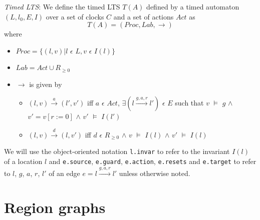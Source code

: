 \begin{definition}
  \emph{Timed LTS}: We define the timed LTS $T(A)$ defined by a timed
  automaton $(L, l_{0}, E, I)$ over a set of clocks $C$ and a set of
  actions $Act$ as 
  \begin{displaymath}
    T(A) = (Proc, Lab, \rightarrow)
  \end{displaymath}
  where
  \begin{itemize}
  \item $Proc = \{(l, v) | l$ $\epsilon$ $L, v$ $\epsilon$ $I(l)\}$
  \item $Lab = Act \cup R_{\ge 0}$
  \item $\rightarrow$ is given by
    \begin{itemize}
    \item $(l, v) \xrightarrow{a} (l', v')$ iff $a$ $\epsilon$ $Act$, $\exists (l
      \xrightarrow{g, a, r} l')$ $\epsilon$ $E$ such that $v$ $\models$
      $g$ $\wedge$ $v'=v[r:=0]$ $\wedge$ $v'$ $\models$ $I(l')$
    \item $(l, v) \xrightarrow{d} (l, v')$ iff $d$ $\epsilon$ $R_{\ge
      0}$ $\wedge$ $v$ $\models$ $I(l)$ $\wedge$ $v'$ $\models$ $I(l)$
    \end{itemize}
  \end{itemize}

\end{definition}

We will use the object-oriented notation \texttt{l.invar} to refer to
the invariant $I(l)$ of a location $l$ and \texttt{e.source}, \texttt{e.guard},
\texttt{e.action}, \texttt{e.resets} and \texttt{e.target} to refer to
$l$, $g$, $a$, $r$, $l'$ of
an edge $e = l \xrightarrow{g, a, r} l'$ unless otherwise noted.

\section{Region graphs}

\begin{figure}
  \centering
  \caption{Motivating examples for region graphs.}

  \begin{subfigure}[b]{0.6\textwidth}
    \centering
    \def\svgwidth{\columnwidth}
    
    \caption{}
    \label{regiongraph01}
  \end{subfigure}%
  ~%
  \begin{subfigure}[b]{0.2\textwidth}
    \centering
    \def\svgwidth{\columnwidth}
    
    \caption{}
    \label{regiongraph02}
  \end{subfigure}

\end{figure}

